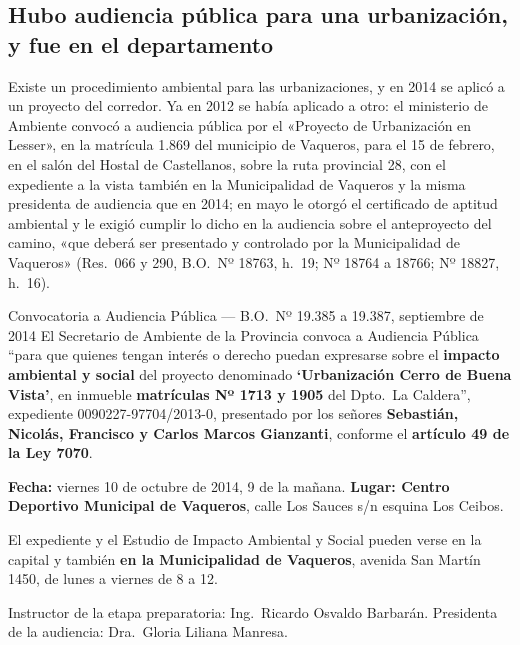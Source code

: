 \subsection*{Hubo audiencia pública para una urbanización, y fue en el departamento}

Existe un procedimiento ambiental para las urbanizaciones, y en 2014 se aplicó a un proyecto del corredor. Ya en 2012 se había aplicado a otro: el ministerio de Ambiente convocó a audiencia pública por el «Proyecto de Urbanización en Lesser», en la matrícula 1.869 del municipio de Vaqueros, para el 15 de febrero, en el salón del Hostal de Castellanos, sobre la ruta provincial 28, con el expediente a la vista también en la Municipalidad de Vaqueros y la misma presidenta de audiencia que en 2014; en mayo le otorgó el certificado de aptitud ambiental y le exigió cumplir lo dicho en la audiencia sobre el anteproyecto del camino, «que deberá ser presentado y controlado por la Municipalidad de Vaqueros» (Res.\ 066 y 290, B.O.\ Nº 18763, h.\ 19; Nº 18764 a 18766; Nº 18827, h.\ 16).

\begin{ficha}{Convocatoria a Audiencia Pública --- B.O.\ Nº 19.385 a 19.387, septiembre de 2014}
El Secretario de Ambiente de la Provincia convoca a Audiencia Pública ``para que quienes tengan interés o derecho puedan expresarse sobre el \textbf{impacto ambiental y social} del proyecto denominado \textbf{`Urbanización Cerro de Buena Vista'}, en inmueble \textbf{matrículas Nº 1713 y 1905} del Dpto.\ La Caldera'', expediente 0090227-97704/2013-0, presentado por los señores \textbf{Sebastián, Nicolás, Francisco y Carlos Marcos Gianzanti}, conforme el \textbf{artículo 49 de la Ley 7070}.

\textbf{Fecha:} viernes 10 de octubre de 2014, 9 de la mañana. \textbf{Lugar: Centro Deportivo Municipal de Vaqueros}, calle Los Sauces s/n esquina Los Ceibos.

El expediente y el Estudio de Impacto Ambiental y Social pueden verse en la capital y también \textbf{en la Municipalidad de Vaqueros}, avenida San Martín 1450, de lunes a viernes de 8 a 12.

Instructor de la etapa preparatoria: Ing.\ Ricardo Osvaldo Barbarán. Presidenta de la audiencia: Dra.\ Gloria Liliana Manresa.
\end{ficha}

